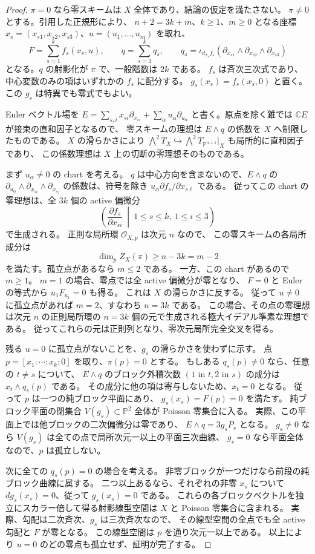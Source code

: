 \begin{proof}
$\pi=0$ なら零スキームは $X$ 全体であり、結論の仮定を満たさない。
$\pi\ne0$ とする。引用した正規形により、
$n+2=3k+m$、$k\ge1$、$m\ge0$ となる座標
$x_s=(x_{s1},x_{s2},x_{s3})$、$u=(u_1,\ldots,u_m)$ を取れ、
\[
 F=\sum_{s=1}^k f_s(x_s,u),\qquad
 q=\sum_{s=1}^k q_s,\qquad
 q_s=\iota_{d_{x_s}f_s}
 (\partial_{x_{s1}}\wedge\partial_{x_{s2}}\wedge\partial_{x_{s3}})
\]
となる。$q$ の射影化が $\pi$ で、一般階数は $2k$ である。
$f_s$ は斉次三次式であり、中心変数のみの項はいずれかの $f_s$ に配分する。
$g_s(x_s)=f_s(x_s,0)$ と置く。
この $g_s$ は特異でも零式でもよい。

Euler ベクトル場を
$E=\sum_{s,i}x_{si}\partial_{x_{si}}+\sum_\alpha u_\alpha\partial_{u_\alpha}$
と書く。原点を除く錐では $\mathbb CE$ が接束の直和因子となるので、
零スキームの理想は $E\wedge q$ の係数を $X$ へ制限したものである。
$X$ の滑らかさにより $\bigwedge^2T_X\hookrightarrow
\bigwedge^2T_{\mathbb P^{n+1}}|_X$ も局所的に直和因子であり、
この係数理想は $X$ 上の切断の零理想そのものである。

まず $u_\alpha\ne0$ の chart を考える。
$q$ は中心方向を含まないので、$E\wedge q$ の
$\partial_{u_\alpha}\wedge\partial_{x_{si}}\wedge\partial_{x_{sj}}$
の係数は、符号を除き
$u_\alpha\partial f_s/\partial x_{s\ell}$ である。
従ってこの chart の零理想は、全 $3k$ 個の active 偏微分
\[
 \left(\frac{\partial f_s}{\partial x_{si}}\ \middle|\
       1\le s\le k,\ 1\le i\le3\right)
\]
で生成される。
正則な局所環 $\mathcal O_{X,p}$ は次元 $n$ なので、
この零スキームの各局所成分は
\[
 \dim_p Z_X(\pi)\ge n-3k=m-2
\]
を満たす。孤立点があるなら $m\le2$ である。
一方、この chart があるので $m\ge1$。
$m=1$ の場合、零点では全 active 偏微分が零となり、
$F=0$ と Euler の等式から $u_1F_{u_1}=0$ も得る。
これは $X$ の滑らかさに反する。
従って $u\ne0$ に孤立点があれば $m=2$、すなわち $n=3k$ である。
この場合、その点の零理想は次元 $n$ の正則局所環の
$n=3k$ 個の元で生成される極大イデアル準素な理想である。
従ってこれらの元は正則列となり、零次元局所完全交叉を得る。

残る $u=0$ に孤立点がないことを、$g_s$ の滑らかさを使わずに示す。
点 $p=[x_1:\cdots:x_k:0]$ を取り、$\pi(p)=0$ とする。
もしある $q_s(p)\ne0$ なら、任意の $t\ne s$ について、
$E\wedge q$ のブロック外積次数 $(1\text{ in }t,2\text{ in }s)$
の成分は $x_t\wedge q_s(p)$ である。
その成分に他の項は寄与しないため、$x_t=0$ となる。
従って $p$ は一つの純ブロック平面にあり、
$g_s(x_s)=F(p)=0$ を満たす。
純ブロック平面の閉集合 $V(g_s)\subset\mathbb P^2$
全体が Poisson 零集合に入る。
実際、この平面上では他ブロックの二次偏微分は零であり、
$E\wedge q=3g_s P_s$ となる。
$g_s\ne0$ なら $V(g_s)$ は全ての点で局所次元一以上の平面三次曲線、
$g_s=0$ なら平面全体なので、$p$ は孤立しない。

次に全ての $q_s(p)=0$ の場合を考える。
非零ブロックが一つだけなら前段の純ブロック曲線に属する。
二つ以上あるなら、それぞれの非零 $x_s$ について
$d g_s(x_s)=0$、従って $g_s(x_s)=0$ である。
これらの各ブロックベクトルを独立にスカラー倍して得る射影線型空間は
$X$ と Poisson 零集合に含まれる。
実際、勾配は二次斉次、$g_s$ は三次斉次なので、
その線型空間の全点でも全 active 勾配と $F$ が零となる。
この線型空間は $p$ を通り次元一以上である。
以上により $u=0$ のどの零点も孤立せず、証明が完了する。
\end{proof}

